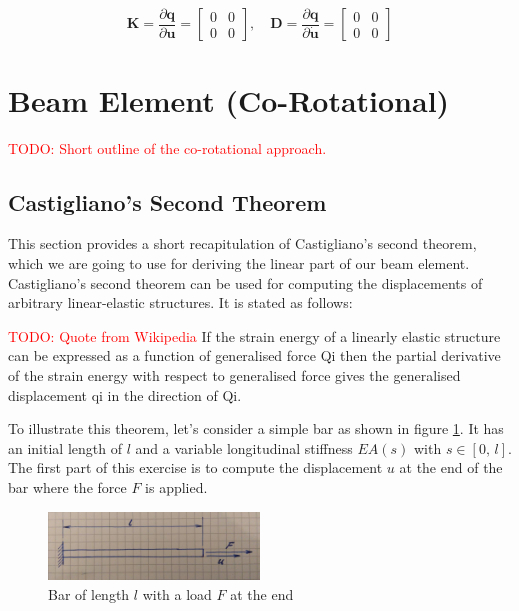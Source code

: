 \begin{equation}
\boldsymbol{K} = \frac{\partial \boldsymbol{q}}{\partial \boldsymbol{u}} =
\begin{bmatrix}
0 & 0\\
0 & 0
\end{bmatrix},
\quad
\boldsymbol{D} = \frac{\partial \boldsymbol{q}}{\partial \dot{\boldsymbol{u}}} =
\begin{bmatrix}
0 & 0\\
0 & 0
\end{bmatrix}
\end{equation}

\newpage
\section{Beam Element (Co-Rotational)}

\textcolor{red}{TODO: Short outline of the co-rotational approach.}

\newpage
\subsection{Castigliano's Second Theorem}

This section provides a short recapitulation of Castigliano's second theorem, which we are going to use for deriving the linear part of our beam element.
Castigliano's second theorem can be used for computing the displacements of arbitrary linear-elastic structures.
It is stated as follows:

\textcolor{red}{TODO: Quote from Wikipedia}
If the strain energy of a linearly elastic structure can be expressed as a function of generalised force Qi then the partial derivative of the strain energy with respect to generalised force gives the generalised displacement qi in the direction of Qi.

To illustrate this theorem, let's consider a simple bar as shown in figure \ref{fig:castigliano-bar-1}.
It has an initial length of $l$ and a variable longitudinal stiffness $EA(s)$ with $s \in [0,\,l]$.
The first part of this exercise is to compute the displacement $u$ at the end of the bar where the force $F$ is applied.

\begin{figure}[h]
\centering
\includegraphics[width=0.5\textwidth]{figures/elements/castigliano-bar-1.jpg}
\caption{Bar of length $l$ with a load $F$ at the end}
\label{fig:castigliano-bar-1}
\end{figure}

